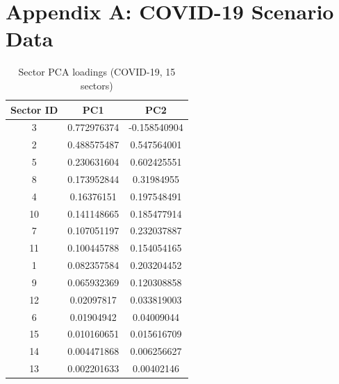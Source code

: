 \chapter*{Appendix A: COVID-19 Scenario Data}

\begin{table}[H]
\centering
\small
\setlength{\tabcolsep}{3pt}
\renewcommand{\arraystretch}{1.1}
\begin{tabular}{@{}ccc@{}}
\toprule
\textbf{Sector ID} & \textbf{PC1} & \textbf{PC2} \\ \midrule
3 & 0.772976374 & -0.158540904 \\
2 & 0.488575487 & 0.547564001 \\
5 & 0.230631604 & 0.602425551 \\
8 & 0.173952844 & 0.31984955 \\
4 & 0.16376151 & 0.197548491 \\
10 & 0.141148665 & 0.185477914 \\
7 & 0.107051197 & 0.232037887 \\
11 & 0.100445788 & 0.154054165 \\
1 & 0.082357584 & 0.203204452 \\
9 & 0.065932369 & 0.120308858 \\
12 & 0.02097817 & 0.033819003 \\
6 & 0.01904942 & 0.04009044 \\
15 & 0.010160651 & 0.015616709 \\
14 & 0.004471868 & 0.006256627 \\
13 & 0.002201633 & 0.00402146 \\ \bottomrule
\end{tabular}
\caption{Sector PCA loadings (COVID-19, 15 sectors)}
\label{tab:sector-mapping}
\end{table}



